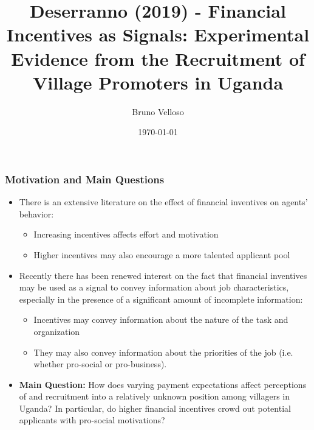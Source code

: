 \documentclass{beamer}
\title[Week 12]{Deserranno (2019) - Financial Incentives as Signals: Experimental Evidence from the Recruitment of Village Promoters in Uganda} %
\author{Bruno Velloso} %
\institute[Columbia] %
{
Columbia University \\ %
{Public Economics and Development - ECOGR6307} \\
\medskip
\textit{bcv2107@columbia.edu} \\
}
\date{\today} %
\begin{document}
\begin{frame}
\titlepage %
\end{frame}








\begin{frame}
\frametitle{Motivation and Main Questions}
\small{
 

 \begin{itemize}
\item There is an extensive literature on the effect of financial inventives on agents' behavior:\medskip
\begin{itemize}
\item Increasing incentives affects effort and motivation\medskip
\item Higher incentives may also encourage a more talented applicant pool\medskip
\end{itemize}
\item Recently there has been renewed interest on the fact that financial inventives may be used as a signal to convey information about job characteristics, especially in the presence of a significant amount of incomplete information: \medskip
\begin{itemize}
\item Incentives may convey information about the nature of the task and organization\medskip
\item They may also convey information about the priorities of the job (i.e. whether pro-social or pro-business). \medskip
\end{itemize}
\item \textbf{Main Question:} How does varying payment expectations affect perceptions of and recruitment into a relatively unknown position among villagers in Uganda? In particular, do higher financial incentives crowd out potential applicants with pro-social motivations? \medskip


\end{itemize}

}
\end{frame}
\end{document}
